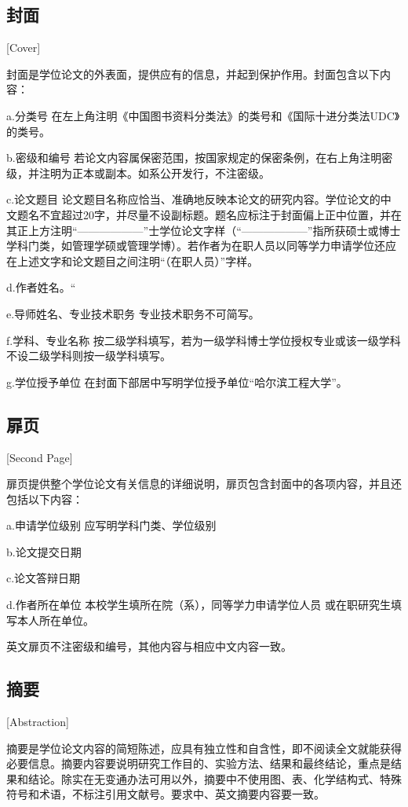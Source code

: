 \subsection{封面}[Cover]

封面是学位论文的外表面，提供应有的信息，并起到保护作用。封面包含以下内容：

a.分类号 \quad 在左上角注明《中国图书资料分类法》的类号和《国际十进分类法UDC》的类号。

b.密级和编号 \quad 若论文内容属保密范围，按国家规定的保密条例，在右上角注明密级，并注明为正本或副本。如系公开发行，不注密级。

c.论文题目 \quad 论文题目名称应恰当、准确地反映本论文的研究内容。学位论文的中文题名不宜超过20字，并尽量不设副标题。题名应标注于封面偏上正中位置，并在其正上方注明“——————”士学位论文字样（“——————”指所获硕士或博士学科门类，如管理学硕或管理学博）。若作者为在职人员以同等学力申请学位还应在上述文字和论文题目之间注明“（在职人员）”字样。

d.作者姓名。“

e.导师姓名、专业技术职务 \quad 专业技术职务不可简写。

f.学科、专业名称 \quad 按二级学科填写，若为一级学科博士学位授权专业或该一级学科不设二级学科则按一级学科填写。

g.学位授予单位 \quad 在封面下部居中写明学位授予单位“哈尔滨工程大学”。

\subsection{扉页}[Second Page]

扉页提供整个学位论文有关信息的详细说明，扉页包含封面中的各项内容，并且还包括以下内容：

a.申请学位级别 \quad 应写明学科门类、学位级别

b.论文提交日期

c.论文答辩日期

d.作者所在单位 \quad 本校学生填所在院（系），同等学力申请学位人员
或在职研究生填写本人所在单位。

英文扉页不注密级和编号，其他内容与相应中文内容一致。

\subsection{摘要}[Abstraction]

摘要是学位论文内容的简短陈述，应具有独立性和自含性，即不阅读全文就能获得必要信息。摘要内容要说明研究工作目的、实验方法、结果和最终结论，重点是结果和结论。除实在无变通办法可用以外，摘要中不使用图、表、化学结构式、特殊符号和术语，不标注引用文献号。要求中、英文摘要内容要一致。


